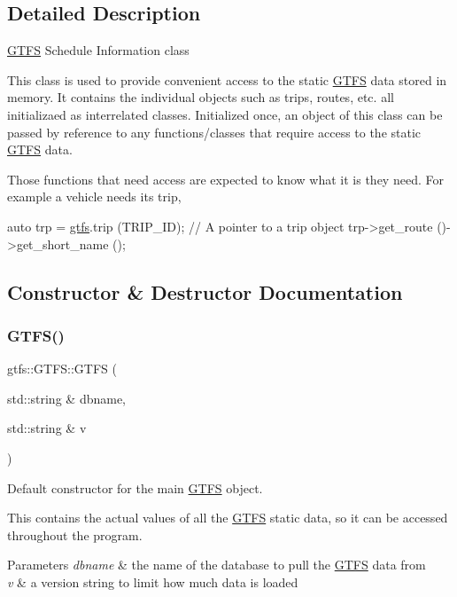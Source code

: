 \subsection{Detailed Description}
\hyperlink{classgtfs_1_1GTFS}{G\+T\+FS} Schedule Information class

This class is used to provide convenient access to the static \hyperlink{classgtfs_1_1GTFS}{G\+T\+FS} data stored in memory. It contains the individual objects such as trips, routes, etc. all initializaed as interrelated classes. Initialized once, an object of this class can be passed by reference to any functions/classes that require access to the static \hyperlink{classgtfs_1_1GTFS}{G\+T\+FS} data.

Those functions that need access are expected to know what it is they need. For example a vehicle needs it\textquotesingle{}s trip, 
\begin{DoxyCode}
\textcolor{keyword}{auto} trp = \hyperlink{namespacegtfs}{gtfs}.trip (TRIP\_ID); \textcolor{comment}{// A pointer to a trip object}
trp->get\_route ()->get\_short\_name ();
\end{DoxyCode}
 

\subsection{Constructor \& Destructor Documentation}
\mbox{\label{classgtfs_1_1GTFS_abe065541610fe5d9673bc4befd0bcf94}} 
\subsubsection{\texorpdfstring{G\+T\+F\+S()}{GTFS()}}
{\footnotesize\ttfamily gtfs\+::\+G\+T\+F\+S\+::\+G\+T\+FS (\begin{DoxyParamCaption}\item[{std\+::string \&}]{dbname,  }\item[{std\+::string \&}]{v }\end{DoxyParamCaption})}

Default constructor for the main \hyperlink{classgtfs_1_1GTFS}{G\+T\+FS} object.

This contains the actual values of all the \hyperlink{classgtfs_1_1GTFS}{G\+T\+FS} static data, so it can be accessed throughout the program.


\begin{DoxyParams}{Parameters}
{\em dbname} & the name of the database to pull the \hyperlink{classgtfs_1_1GTFS}{G\+T\+FS} data from \\
\hline
{\em v} & a version string to limit how much data is loaded \\
\hline
\end{DoxyParams}


